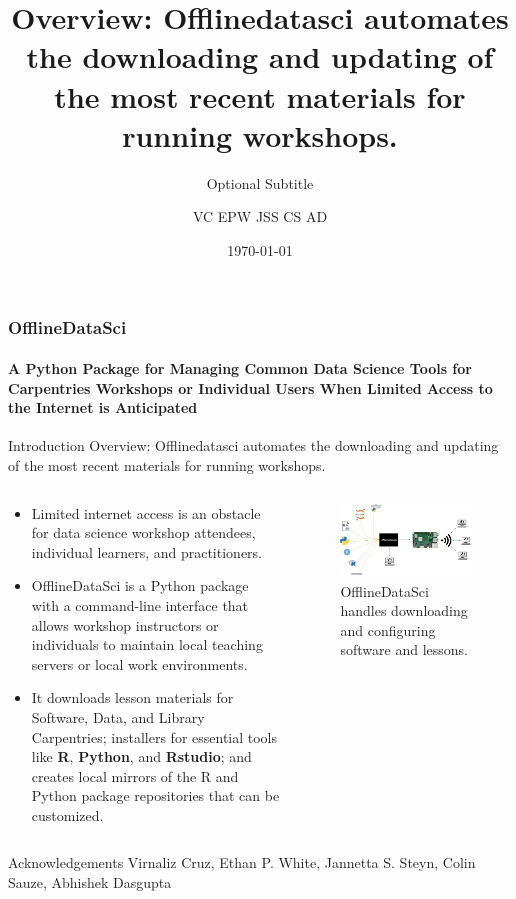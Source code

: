 \documentclass[
	8pt,
]{beamer}
\title[OfflineDataSci]{Overview: Offlinedatasci automates the downloading and updating of the most recent materials for running workshops.}
\subtitle{Optional Subtitle}
\author[VC EPW JSS CS AD]{VC EPW JSS CS AD}
\date[\today]{\today}
\begin{document}
\begin{frame}
	\frametitle{OfflineDataSci} %
	\framesubtitle{A Python Package for Managing Common Data Science Tools for Carpentries Workshops or Individual Users When Limited Access to the Internet is Anticipated}
	\begin{block}{Introduction}
	Overview: Offlinedatasci automates the downloading and updating of the most recent materials for running workshops.
	\end{block}	
	\begin{columns}[t]
		\begin{column}{0.6\textwidth} %
		
			\begin{itemize}
   				\item Limited internet access is an obstacle for data science workshop attendees, individual learners, and practitioners.
       
				\item OfflineDataSci is a Python package with a command-line interface that allows workshop instructors or individuals to maintain local teaching servers or local work environments.
				
				\item It downloads lesson materials for Software, Data, and Library Carpentries; installers for essential tools like \textbf{R}, \textbf{Python}, and \textbf{Rstudio}; and creates local mirrors of the R and Python package repositories that can be customized.
    
			\end{itemize}
		\end{column}
		
		\begin{column}{0.4\textwidth} %
			\begin{figure}
				\includegraphics[width=1\linewidth]{offlinedatasci.png}
				\caption{OfflineDataSci handles downloading and configuring software and lessons.}
			\end{figure}
		\end{column}
	\end{columns}
	\begin{block}{Acknowledgements}
		Virnaliz Cruz, Ethan P. White, Jannetta S. Steyn, Colin Sauze, Abhishek Dasgupta
	\end{block}
\end{frame}
\end{document}
